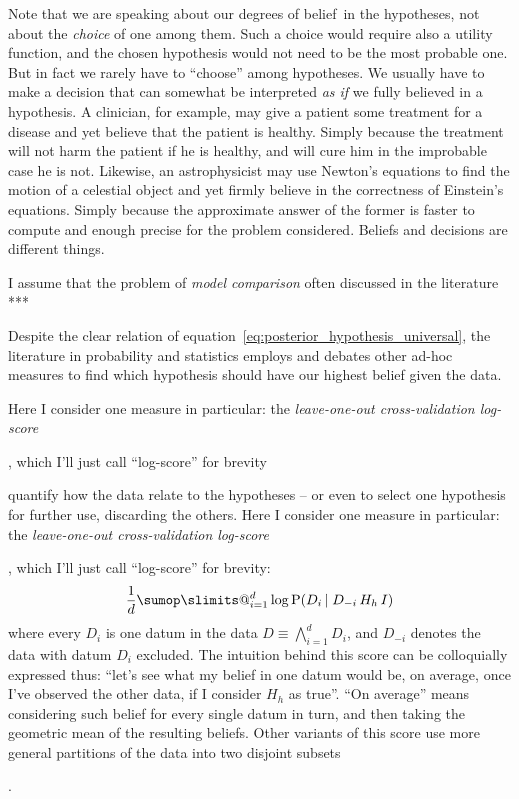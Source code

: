 \documentclass[\ifafour a4paper,12pt,\else a5paper,10pt,\fi%
onecolumn,oneside,article,%
british%
]{memoir}
\makeatletter
\theoremstyle{remark}
\theoremstyle{innote}
\def\sum{\DOTSI\sumop\slimits@}
\newcommand*{\Land}{\bigwedge}
\newcommand*{\p}{\mathrm{P}}%
\renewcommand*{\|}[1][]{\nonscript\,#1\vert\nonscript\;\mathopen{}}
\newcommand*{\dobs}{degrees of belief}
\newcommand*{\yK}{I}
\makeatother
\begin{document}
Note that we are speaking about our \dobs\ in the hypotheses, not about the
\emph{choice} of one among them. Such a choice would require also a utility
function, and the chosen hypothesis would not need to be the most probable
one. But in fact we rarely have to \enquote{choose} among hypotheses. We
usually have to make a decision that can somewhat be interpreted \emph{as
  if} we fully believed in a hypothesis. A clinician, for example, may give
a patient some treatment for a disease and yet believe that the patient is
healthy. Simply because the treatment will not harm the patient if he is
healthy, and will cure him in the improbable case he is not. Likewise, an
astrophysicist may use Newton's equations to find the motion of a celestial
object and yet firmly believe in the correctness of Einstein's equations.
Simply because the approximate answer of the former is faster to compute
and enough precise for the problem considered. Beliefs and decisions are
different things.

I assume that the problem of \emph{model comparison} often discussed in the
literature ***

Despite the clear relation of
equation~\eqref{eq:posterior_hypothesis_universal}, the literature in
probability and statistics employs and debates other ad-hoc measures to
find which hypothesis should have our highest belief given the data.

Here I consider one measure in particular: the \emph{leave-one-out
  cross-validation log-score}\addtocounter{footnote}{-1}\footnotemark{},
which I'll just call \enquote{log-score} for brevity




quantify how the data relate to the hypotheses -- or even to select one
hypothesis for further use, discarding the others.
Here I consider one measure in particular: the \emph{leave-one-out
  cross-validation log-score}\addtocounter{footnote}{-1}\footnotemark{},
which I'll just call \enquote{log-score} for brevity:
\begin{equation}
  \label{eq:log-score}
  \frac{1}{d} \sum_{i=1}^{d} \log\p(D_{i} \| D_{-i} \, H_{h} \, \yK)
\end{equation}
where every $D_{i}$ is one datum in the data $D \equiv \Land_{i=1}^{d} D_{i}$,
and $D_{-i}$ denotes the data with datum $D_{i}$ excluded. The intuition
behind this score can be colloquially expressed thus: \enquote{let's see
  what my belief in one datum would be, on average, once I've observed the
  other data, if I consider $H_{h}$ as true}. \enquote{On average} means
considering such belief for every single datum in turn, and then taking the
geometric mean of the resulting
beliefs. %
Other variants of this score use more general partitions of the data into
two disjoint subsets\addtocounter{footnote}{-1}\footnotemark{}.
\end{document}
